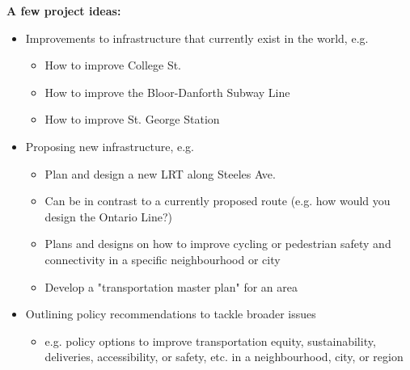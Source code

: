 \documentclass[aspectratio=169]{beamer}
\begin{document}
\begin{frame}
	
	\textbf{A few project ideas:}
	\begin{itemize}
		\item Improvements to infrastructure that currently exist in the world, e.g.
		\begin{itemize}
			\item How to improve College St.
			\item How to improve the Bloor-Danforth Subway Line
			\item How to improve St. George Station
		\end{itemize}
		\item Proposing new infrastructure, e.g.
		\begin{itemize}
			\item Plan and design a new LRT along Steeles Ave.
			\item Can be in contrast to a currently proposed route (e.g. how would you design the Ontario Line?)
			\item Plans and designs on how to improve cycling or pedestrian safety and connectivity in a specific neighbourhood or city
			\item Develop a "transportation master plan" for an area
		\end{itemize}
		\item Outlining policy recommendations to tackle broader issues
		\begin{itemize}
			\item e.g. policy options to improve transportation equity, sustainability, deliveries, accessibility, or safety, etc. in a neighbourhood, city, or region
		\end{itemize}
	\end{itemize}
	
\end{frame}
\end{document}
